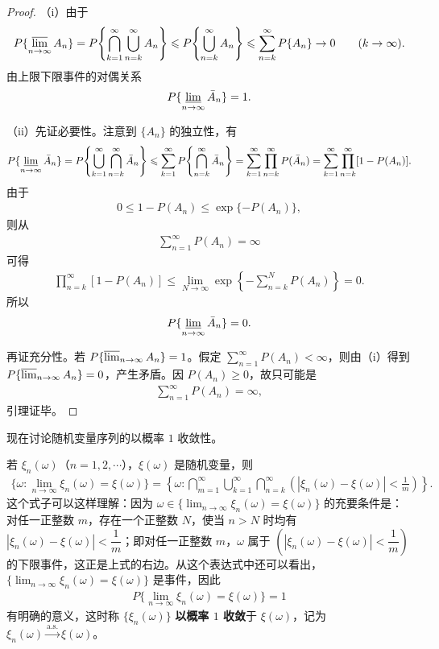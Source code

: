 \documentclass[../../main.tex]{subfiles}
\begin{document}
\begin{proof}
（i）由于
\begin{align*}
P\{\varlimsup_{n\to\infty}A_n\}=P\!\left\{\bigcap_{k=1}^{\infty}\bigcup_{n=k}^{\infty}A_n\right\}
\leqslant P\!\left\{\bigcup_{n=k}^{\infty}A_n\right\}\leqslant\sum_{n=k}^{\infty}P\{A_n\}\to0\qquad(k\to\infty).
\end{align*}
由上限下限事件的对偶关系
\begin{align*}
P\{\varliminf_{n\to\infty}\bar{A}_n\}=1.
\end{align*}

（ii）先证必要性。注意到 $\{A_n\}$ 的独立性，有
\begin{align*}
P\{\varliminf_{n\to\infty}\bar{A}_n\}=P\!\left\{\bigcup_{k=1}^{\infty}\bigcap_{n=k}^{\infty}\bar{A}_n\right\}
\leqslant\sum_{k=1}^{\infty}P\!\left\{\bigcap_{n=k}^{\infty}\bar{A}_n\right\}
=\sum_{k=1}^{\infty}\prod_{n=k}^{\infty}P(\bar{A}_n)
=\sum_{k=1}^{\infty}\prod_{n=k}^{\infty}[1-P(A_n)].
\end{align*}
由于
\begin{align*}
0\leqslant1-P(A_n)\leqslant\exp\{-P(A_n)\},
\end{align*}
则从
\begin{align*}
\sum_{n=1}^{\infty}P(A_n)=\infty
\end{align*}
可得
\begin{align*}
\prod_{n=k}^{\infty}[1-P(A_n)]\leqslant\lim_{N\to\infty}\exp\!\left\{-\sum_{n=k}^{N}P(A_n)\right\}=0.
\end{align*}
所以
\begin{align*}
P\{\varliminf_{n\to\infty}\bar{A}_n\}=0.
\end{align*}

再证充分性。若 $P\{\varlimsup_{n\to\infty}A_n\}=1$。假定 $\sum_{n=1}^{\infty}P(A_n)<\infty$，则由（i）得到 $P\{\varlimsup_{n\to\infty}A_n\}=0$，产生矛盾。因 $P(A_n)\geqslant0$，故只可能是
\begin{align*}
\sum_{n=1}^{\infty}P(A_n)=\infty,
\end{align*}
引理证毕。
\end{proof}

现在讨论随机变量序列的以概率 $1$ 收敛性。

若 $\xi_n(\omega)$（$n=1,2,\cdots$），$\xi(\omega)$ 是随机变量，则
\begin{align}
\{\omega:\lim_{n\to\infty}\xi_n(\omega)=\xi(\omega)\}
=\left\{\omega:\bigcap_{m=1}^{\infty}\bigcup_{k=1}^{\infty}\bigcap_{n=k}^{\infty}\left(|\xi_n(\omega)-\xi(\omega)|<\frac1m\right)\right\}.
\end{align}
这个式子可以这样理解：因为 $\omega\in\{\lim_{n\to\infty}\xi_n(\omega)=\xi(\omega)\}$ 的充要条件是：对任一正整数 $m$，存在一个正整数 $N$，使当 $n>N$ 时均有 $|\xi_n(\omega)-\xi(\omega)|<\dfrac1m$；即对任一正整数 $m$，$\omega$ 属于 $\left(|\xi_n(\omega)-\xi(\omega)|<\dfrac1m\right)$ 的下限事件，这正是上式的右边。从这个表达式中还可以看出，$\{\lim_{n\to\infty}\xi_n(\omega)=\xi(\omega)\}$ 是事件，因此
\begin{align}
P\{\lim_{n\to\infty}\xi_n(\omega)=\xi(\omega)\}=1
\end{align}
有明确的意义，这时称 $\{\xi_n(\omega)\}$ \textbf{以概率 $1$ 收敛}于 $\xi(\omega)$，记为 $\xi_n(\omega)\xrightarrow{\mathrm{a.s.}}\xi(\omega)$。
\end{document}
